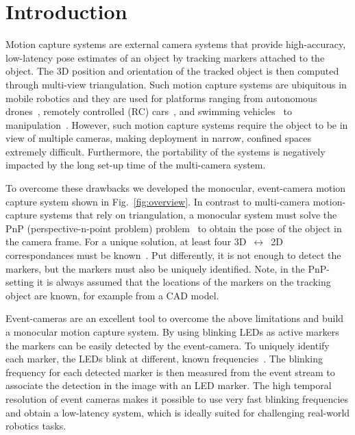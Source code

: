 \section{Introduction}
\label{sec:introduction}
Motion capture systems are external camera systems that provide high-accuracy, low-latency pose estimates of an object by tracking markers attached to the object. The 3D position and orientation of the tracked object is then computed through multi-view triangulation. Such motion capture systems are ubiquitous in mobile robotics and they are used for platforms ranging from autonomous drones~\cite{ducard2009fma, kaufmann23champion}, remotely controlled (RC) cars~\cite{froehlich2022contextual}, and swimming vehicles~\cite{menolotto2020mocapreview} to manipulation~\cite{aljalbout2024transfer}. However, such motion capture systems require the object to be in view of multiple cameras, making deployment in narrow, confined spaces extremely difficult. Furthermore, the portability of the systems is negatively impacted by the long set-up time of the multi-camera system.

To overcome these drawbacks we developed the monocular, event-camera motion capture system shown in Fig.~\ref{fig:overview}. In contrast to multi-camera motion-capture systems that rely on triangulation, a monocular system must solve the PnP (perspective-n-point problem) problem~\cite{zisserman2004multipleview} to obtain the pose of the object in the camera frame. For a unique solution, at least four 3D~$\leftrightarrow$~2D correspondances must be known~\cite{gao2003complete}. Put differently, it is not enough to detect the markers, but the markers must also be uniquely identified. Note, in the PnP-setting it is always assumed that the locations of the markers on the tracking object are known, for example from a CAD model.

Event-cameras are an excellent tool to overcome the above limitations and build a monocular motion capture system. By using blinking LEDs as active markers the markers can be easily detected by the event-camera. To uniquely identify each marker, the LEDs blink at different, known frequencies~\cite{censi2013activeled}. The blinking frequency for each detected marker is then measured from the event stream to associate the detection in the image with an LED marker. The high temporal resolution of event cameras makes it possible to use very fast blinking frequencies and obtain a low-latency system, which is ideally suited for challenging real-world robotics tasks. 

